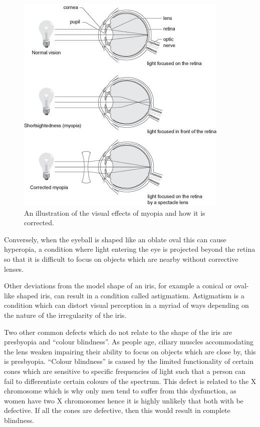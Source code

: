 \begin{figure}[H]
\centering
\includegraphics{figures/myopia}
\caption{An illustration of the visual effects of myopia and how it is corrected.}
\label{fig:myop}
\end{figure}

Conversely, when the eyeball is shaped like an oblate oval this can cause
hyperopia, a condition where light entering the eye is projected beyond the
retina so that it is difficult to focus on objects which are nearby without
corrective lenses.

Other deviations from the model shape of an iris, for example a conical
or oval-like shaped iris, can result in a condition called astigmatism.
Astigmatism is a condition which can distort visual perception in a myriad
of ways depending on the nature of the irregularity of the iris.

Two other common defects which do not relate to the shape of the iris are
presbyopia and \enquote{colour blindness}. As people age, ciliary muscles
accommodating the  lens weaken impairing their ability to focus on objects
which are close by, this is presbyopia. \cite{fisher1985ciliary}
\enquote{Colour blindness} is caused by the limited functionality of certain
cones which are sensitive to specific frequencies of light such that a person
can fail to differentiate certain colours of the spectrum. This defect is related
to the X chromosome which is why only men tend to suffer from this
dysfunction, as women have two X chromosomes hence it is highly unlikely
that both with be defective.\cite{george1996clinical} If all the cones are
defective, then this would result in complete blindness.

